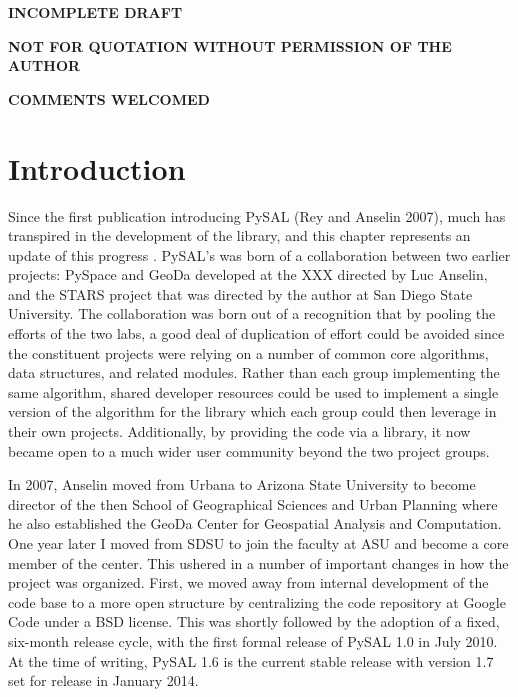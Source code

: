 \documentclass[11pt, titlepage]{article}
\begin{document}
\maketitle


\textbf{INCOMPLETE DRAFT}

\textbf{NOT FOR QUOTATION WITHOUT PERMISSION OF THE AUTHOR}

\textbf{COMMENTS WELCOMED}

\section{Introduction}

Since the first publication introducing PySAL (Rey and Anselin 2007),
much has transpired in the development of the library, and this chapter
represents an update of this progress . PySAL's was born of a
collaboration between two earlier projects: PySpace and GeoDa developed
at the XXX directed by Luc Anselin, and the STARS project that was
directed by the author at San Diego State University. The collaboration
was born out of a recognition that by pooling the efforts of the two
labs, a good deal of duplication of effort could be avoided since the
constituent projects were relying on a number of common core algorithms,
data structures, and related modules. Rather than each group
implementing the same algorithm, shared developer resources could be
used to implement a single version of the algorithm for the library
which each group could then leverage in their own projects.
Additionally, by providing the code via a library, it now became open to
a much wider user community beyond the two project groups.

In 2007, Anselin moved from Urbana to Arizona State University to become
director of the then School of Geographical Sciences and Urban Planning
where he also established the GeoDa Center for Geospatial Analysis and
Computation. One year later I moved from SDSU to join the faculty at ASU
and become a core member of the center. This ushered in a number of
important changes in how the project was organized. First, we moved away
from internal development of the code base to a more open structure by
centralizing the code repository at Google Code under a BSD license.
This was shortly followed by the adoption of a fixed, six-month release
cycle, with the first formal release of PySAL 1.0 in July 2010. At the
time of writing, PySAL 1.6 is the current stable release with version
1.7 set for release in January 2014.
\end{document}
